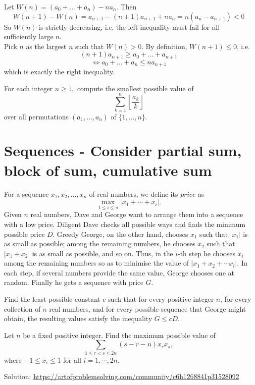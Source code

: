 \documentclass[11pt]{scrartcl}
\begin{document}
Let $W(n) = (a_0 + ... + a_n) - na_n$. Then
\[W(n+1) - W(n) = a_{n+1} - (n+1)a_{n+1} + na_n = n(a_n - a_{n+1}) < 0\]
So $W(n)$ is strictly decreasing, i.e. the left inequality must fail for all sufficiently large $n$.\\

Pick $n$ as the largest $n$ such that $W(n) > 0$. By definition, $W(n+1) \le 0$, i.e.
\[(n+1)a_{n+1} \ge a_0 + ... + a_{n+1}\]
\[\iff a_0 + ... + a_n \le na_{n+1}\]
which is exactly the right inequality.


\begin{Problem}
For each integer $n\ge 1,$ compute the smallest possible value of\[\sum_{k=1}^{n}\left\lfloor\frac{a_k}{k}\right\rfloor\]over all permutations $(a_1,\dots,a_n)$ of $\{1,\dots,n\}.$
\end{Problem}






\section{Sequences - Consider partial sum, block of sum, cumulative sum}
\begin{Problem}
For a sequence $x_1,x_2,\ldots,x_n$ of real numbers, we define its $\textit{price}$ as\[\max_{1\le i\le n}|x_1+\cdots +x_i|.\]Given $n$ real numbers, Dave and George want to arrange them into a sequence with a low price. Diligent Dave checks all possible ways and finds the minimum possible price $D$. Greedy George, on the other hand, chooses $x_1$ such that $|x_1 |$ is as small as possible; among the remaining numbers, he chooses $x_2$ such that $|x_1 + x_2 |$ is as small as possible, and so on. Thus, in the $i$-th step he chooses $x_i$ among the remaining numbers so as to minimise the value of $|x_1 + x_2 + \cdots  x_i |$. In each step, if several numbers provide the same value, George chooses one at random. Finally he gets a sequence with price $G$.

Find the least possible constant $c$ such that for every positive integer $n$, for every collection of $n$ real numbers, and for every possible sequence that George might obtain, the resulting values satisfy the inequality $G\le cD$.
\end{Problem}



\begin{Problem}
Let $n$ be a fixed positive integer. Find the maximum possible value of\[ \sum_{1 \le r < s \le 2n} (s-r-n)x_rx_s, \]where $-1 \le x_i \le 1$ for all $i = 1, \cdots , 2n$.
\end{Problem}
Solution: \url{https://artofproblemsolving.com/community/c6h1268841p31528092}
\end{document}

